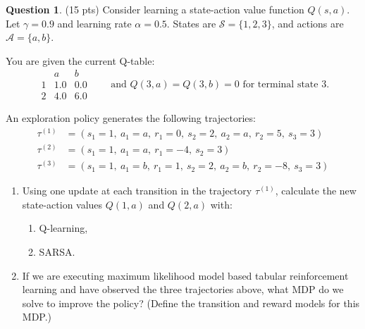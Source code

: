 \documentclass{article}
\theoremstyle{definition}
\newtheorem{question}[thm]{Question}
\begin{document}
\begin{question}\label{q:td-control} (15 pts)
Consider learning a state-action value function $Q(s,a)$.
Let $\gamma=0.9$ and learning rate $\alpha=0.5$. States are $\mathcal{S} = \{1,2,3\}$, and actions are $\mathcal{A}=\{a,b\}$.

You are given the current Q-table:
\[
\begin{array}{c|cc}
 & a & b\\ \hline
1 & 1.0 & 0.0\\
2 & 4.0 & 6.0
\end{array}
\qquad
\text{and } Q(3,a)=Q(3,b)=0 \text{ for terminal state } 3.
\]

An exploration policy generates the following trajectories:
\begin{align}
    \tau^{(1)} &= (s_1=1,\ a_1=a,\ r_1=0,\ s_2=2,\ a_2=a,\ r_2=5,\ s_3=3)\\
    \tau^{(2)} &= (s_1=1,\ a_1=a,\ r_1=-4,\ s_2=3)\\
    \tau^{(3)} &= (s_1=1,\ a_1=b,\ r_1=1,\ s_2=2,\ a_2=b,\ r_2=-8,\ s_3=3)
\end{align}

\begin{enumerate}[label=\alph*)]
    \item Using one update at each transition in the trajectory $\tau^{(1)}$, calculate the new state-action values $Q(1,a)$ and $Q(2,a)$ with:
    \begin{enumerate}[label=\roman*)]
        \item Q-learning,
        \item SARSA.
    \end{enumerate}
    \item If we are executing maximum likelihood model based tabular reinforcement learning and have observed the three trajectories above, what MDP do we solve to improve the policy? (Define the transition and reward models for this MDP.)
\end{enumerate}


\end{question}
\vspace{3cm}
\end{document}
